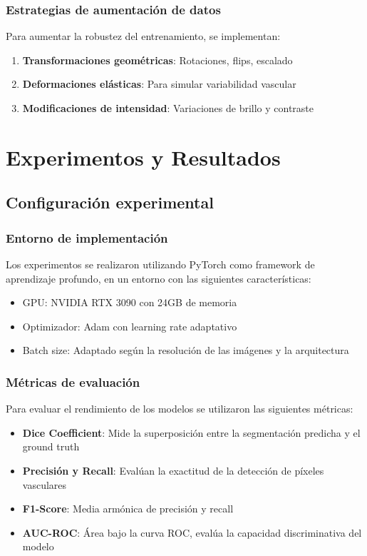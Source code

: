 \documentclass[11pt,a4paper]{report} %
\begin{document}
\subsection{Estrategias de aumentación de datos}
Para aumentar la robustez del entrenamiento, se implementan:
\begin{enumerate}
  \item \textbf{Transformaciones geométricas}: Rotaciones, flips, escalado
  \item \textbf{Deformaciones elásticas}: Para simular variabilidad vascular
  \item \textbf{Modificaciones de intensidad}: Variaciones de brillo y contraste
\end{enumerate}

\chapter{Experimentos y Resultados}
\section{Configuración experimental}
\subsection{Entorno de implementación}
Los experimentos se realizaron utilizando PyTorch como framework de aprendizaje profundo, en un entorno con las siguientes características:
\begin{itemize}
  \item GPU: NVIDIA RTX 3090 con 24GB de memoria
  \item Optimizador: Adam con learning rate adaptativo
  \item Batch size: Adaptado según la resolución de las imágenes y la arquitectura
\end{itemize}

\subsection{Métricas de evaluación}
Para evaluar el rendimiento de los modelos se utilizaron las siguientes métricas:
\begin{itemize}
  \item \textbf{Dice Coefficient}: Mide la superposición entre la segmentación predicha y el ground truth
  \item \textbf{Precisión y Recall}: Evalúan la exactitud de la detección de píxeles vasculares
  \item \textbf{F1-Score}: Media armónica de precisión y recall
  \item \textbf{AUC-ROC}: Área bajo la curva ROC, evalúa la capacidad discriminativa del modelo
\end{itemize}
\end{document}
